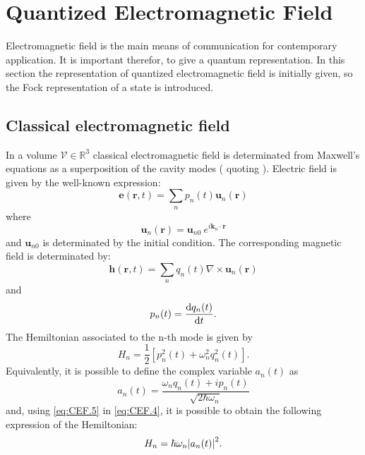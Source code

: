 \section{Quantized Electromagnetic Field}
    Electromagnetic field is the main means of communication for contemporary
    application. It is important therefor, to give a quantum representation.
    In this section the representation of quantized electromagnetic field is 
    initially given, so the Fock representation of a state is introduced.
            
    \subsection{Classical electromagnetic field}
        In a volume $\mathcal{V}\in\mathbb{R}^3$ classical electromagnetic field is 
        determinated from Maxwell's equations as a superposition of the cavity modes
        (\cite{tesiGuerrini} quoting \cite{quantumRad_Louissel,quantumOptic_Mandel}).
        Electric field is given by the well-known expression:
        \begin{equation}
            \pmb{e}(\pmb{r},t)=\sum_n p_n (t)\pmb{u}_n (\pmb{r})
            \label{eq:CEF.1}
        \end{equation}
        where
        \begin{equation*}
            \pmb{u}_n (\pmb{r})=\pmb{u}_{n0}\ e^{i\pmb{k}_n \cdot \pmb{r}}
        \end{equation*}
        and $\pmb{u}_{n0}$ is determinated by the initial condition.
        The corresponding magnetic field is determinated by:
        \begin{equation}
            \pmb{h}(\pmb{r},t)=\sum_n q_n (t)\nabla\times\pmb{u}_n (\pmb{r})
            \label{eq:CEF.2}
        \end{equation}
        and
        \begin{equation}
            p_n (t)=\derivative{q_n (t)}{t} .
            \label{eq:CEF.3}
        \end{equation}
        The Hemiltonian associated to the n-th mode is given by
        \begin{equation}
            H_n=\frac{1}{2}[p_n^2(t)+\omega_n^2q_n^2(t)].
            \label{eq:CEF.4}
        \end{equation}
        Equivalently, it is possible to define the complex variable $a_n(t)$ as
        \begin{equation}
            a_n(t)=\frac{\omega_nq_n(t)+ip_n(t)}{\sqrt{2\hbar\omega_n}}
            \label{eq:CEF.5}
        \end{equation}
        and, using \ref{eq:CEF.5} in \ref{eq:CEF.4}, it is possible to obtain the following
        expression of the Hemiltonian:
        \begin{equation}
            H_n=\hbar\omega_n\absolutevalue{a_n(t)}^2.
            \label{eq_CEF.6}
        \end{equation}

